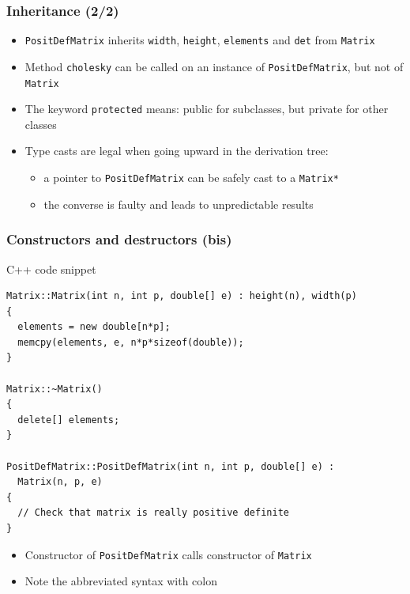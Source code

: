 \documentclass{beamer}
\begin{document}
\begin{frame}
  \frametitle{Inheritance (2/2)}
  \begin{itemize}
  \item \texttt{PositDefMatrix} inherits \texttt{width}, \texttt{height}, \texttt{elements} and \texttt{det} from \texttt{Matrix}
  \item Method \texttt{cholesky} can be called on an instance of \texttt{PositDefMatrix}, but not of \texttt{Matrix}
  \item The keyword \texttt{protected} means: public for subclasses, but private for other classes
  \item \alert{Type casts} are legal when going upward in the derivation tree:
    \begin{itemize}
    \item a pointer to \texttt{PositDefMatrix} can be safely cast to a \texttt{Matrix*}
    \item the converse is faulty and leads to unpredictable results
    \end{itemize}
  \end{itemize}
\end{frame}

\begin{frame}[fragile]
  \frametitle{Constructors and destructors (bis)}
  \begin{block}{C++ code snippet}
    \begin{scriptsize}
\begin{verbatim}
Matrix::Matrix(int n, int p, double[] e) : height(n), width(p)
{
  elements = new double[n*p];
  memcpy(elements, e, n*p*sizeof(double));
}

Matrix::~Matrix()
{
  delete[] elements;
}

PositDefMatrix::PositDefMatrix(int n, int p, double[] e) :
  Matrix(n, p, e)
{
  // Check that matrix is really positive definite
}
\end{verbatim}
    \end{scriptsize}
  \end{block}
  \begin{itemize}
  \item Constructor of \texttt{PositDefMatrix} calls constructor of \texttt{Matrix}
  \item Note the abbreviated syntax with colon
  \end{itemize}
\end{frame}
\end{document}
